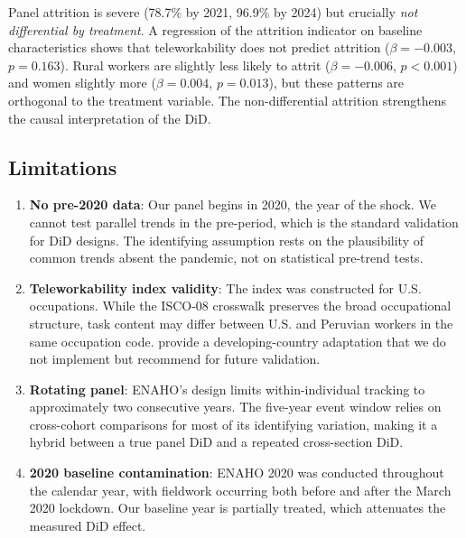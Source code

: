 Panel attrition is severe (78.7\% by 2021, 96.9\% by 2024) but crucially \textit{not differential by treatment}. A regression of the attrition indicator on baseline characteristics shows that teleworkability does not predict attrition ($\beta = -0.003$, $p = 0.163$). Rural workers are slightly less likely to attrit ($\beta = -0.006$, $p < 0.001$) and women slightly more ($\beta = 0.004$, $p = 0.013$), but these patterns are orthogonal to the treatment variable. The non-differential attrition strengthens the causal interpretation of the DiD.

\subsection{Limitations}

\begin{enumerate}
    \item \textbf{No pre-2020 data}: Our panel begins in 2020, the year of the shock. We cannot test parallel trends in the pre-period, which is the standard validation for DiD designs. The identifying assumption rests on the plausibility of common trends absent the pandemic, not on statistical pre-trend tests.
    \item \textbf{Teleworkability index validity}: The \citet{dingel2020} index was constructed for U.S. occupations. While the ISCO-08 crosswalk preserves the broad occupational structure, task content may differ between U.S. and Peruvian workers in the same occupation code. \citet{saltiel2020} provide a developing-country adaptation that we do not implement but recommend for future validation.
    \item \textbf{Rotating panel}: ENAHO's design limits within-individual tracking to approximately two consecutive years. The five-year event window relies on cross-cohort comparisons for most of its identifying variation, making it a hybrid between a true panel DiD and a repeated cross-section DiD.
    \item \textbf{2020 baseline contamination}: ENAHO 2020 was conducted throughout the calendar year, with fieldwork occurring both before and after the March 2020 lockdown. Our baseline year is partially treated, which attenuates the measured DiD effect.
\end{enumerate}
